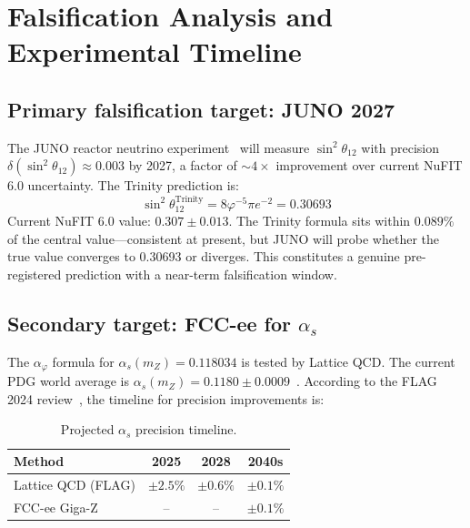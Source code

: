 \documentclass[10pt,a4paper]{article}
\begin{document}
\section*{Falsification Analysis and Experimental Timeline}

\subsection*{Primary falsification target: JUNO 2027}

The JUNO reactor neutrino experiment~\cite{JUNO2022} will measure $\sin^2\theta_{12}$ with
precision $\delta(\sin^2\theta_{12}) \approx 0.003$ by 2027, a factor of $\sim 4\times$
improvement over current NuFIT 6.0 uncertainty. The Trinity prediction is:
\begin{equation}
  \sin^2\theta_{12}^{\text{Trinity}} = 8\varphi^{-5}\pi e^{-2} = 0.30693
  \label{eq:theta12}
\end{equation}
Current NuFIT 6.0 value: $0.307 \pm 0.013$. The Trinity formula sits within $0.089\%$ of the
central value---consistent at present, but JUNO will probe whether the true value converges to
0.30693 or diverges. This constitutes a genuine pre-registered prediction with a near-term
falsification window.

\subsection*{Secondary target: FCC-ee for $\alpha_s$}

The $\alpha_\varphi$ formula for $\alpha_s(m_Z) = 0.118034$ is tested by Lattice QCD.
The current PDG world average is $\alpha_s(m_Z) = 0.1180 \pm 0.0009$~\cite{PDG2024}.
According to the FLAG 2024 review~\cite{FLAG2023}, the timeline for precision improvements is:

\begin{table}[h!]
\centering
\caption{Projected $\alpha_s$ precision timeline.}
\begin{tabular}{lccc}
\toprule
Method & 2025 & 2028 & 2040s \\
\midrule
Lattice QCD (FLAG) & $\pm 2.5\%$ & $\pm 0.6\%$ & $\pm 0.1\%$ \\
FCC-ee Giga-Z & -- & -- & $\pm 0.1\%$ \\
\bottomrule
\end{tabular}
\end{table}
\end{document}
